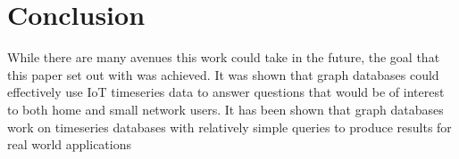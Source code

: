 \documentclass[conference]{IEEEtran}
\begin{document}
\section{Conclusion}
While there are many avenues this work could take in the future, the goal that this paper set out with was
achieved. It was shown that graph databases could effectively use IoT timeseries data to answer questions
that would be of interest to both home and small network users. It has been shown that graph databases work
on timeseries databases with relatively simple queries to produce results for real world applications

\printbibliography
\end{document}
